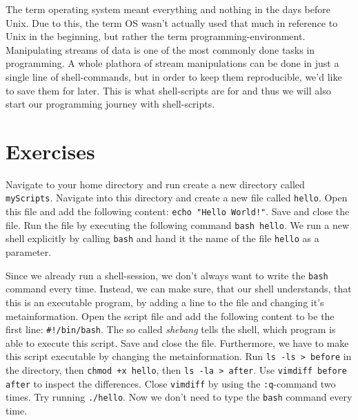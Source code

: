 \documentclass{dcbl/challenge}
\begin{document}
The term operating system meant everything and nothing in the days before Unix.
Due to this, the term OS wasn't actually used that much in reference to Unix in the beginning, but rather the term programming-environment.
Manipulating streams of data is one of the most commonly done tasks in programming.
A whole plathora of stream manipulations can be done in just a single line of shell-commands, but in order to keep them reproducible, we'd like to save them for later.
This is what shell-scripts are for and thus we will also start our programming journey with shell-scripts.


\section*{Exercises}
\begin{aufgabe}
    Navigate to your home directory and run create a new directory called \texttt{myScripts}.
    Navigate into this directory and create a new file called \texttt{hello}.
    Open this file and add the following content: \texttt{echo "Hello World!"}.
    Save and close the file.
    Run the file by executing the following command \texttt{bash hello}.
    We run a new shell explicitly by calling \texttt{bash} and hand it the name of the file \texttt{hello} as a parameter.
\end{aufgabe}

\begin{aufgabe}
    Since we already run a shell-session, we don't always want to write the \texttt{bash} command every time.
    Instead, we can make sure, that our shell understands, that this is an executable program, by adding a line to the file and changing it's metainformation.
    Open the script file and add the following content to be the first line: \texttt{\#!/bin/bash}.
    The so called \textit{shebang} tells the shell, which program is able to execute this script.
    Save and close the file.
    Furthermore, we have to make this script executable by changing the metainformation.
    Run \texttt{ls -ls > before} in the directory, then \texttt{chmod +x hello}, then \texttt{ls -la > after}. 
    Use \texttt{vimdiff before after} to inspect the differences.
    Close \texttt{vimdiff} by using the \texttt{:q}-command two times.
    Try running \texttt{./hello}.
    Now we don't need to type the \texttt{bash} command every time.
\end{aufgabe}
\end{document}
